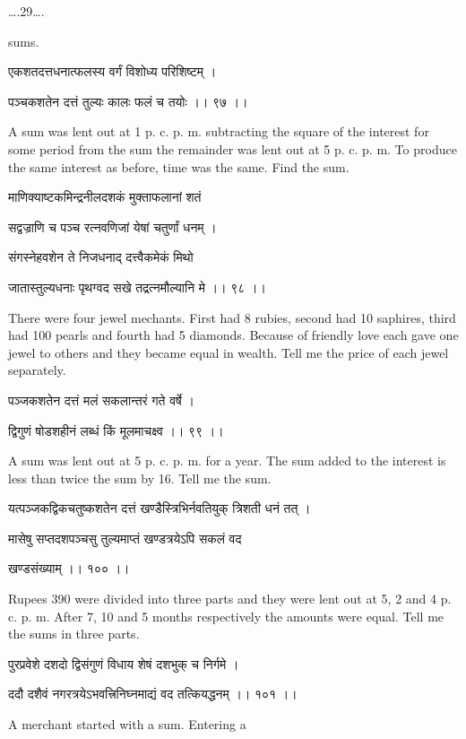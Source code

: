 \documentclass[]{article}
\date{}
\begin{document}
{\ldots{}.29\ldots{}.}

{sums.}

{एकशतदत्तधनात्फलस्य वर्गं विशोध्य परिशिष्टम् । }

{पञ्चकशतेन दत्तं तुल्यः कालः फलं च तयोः ।। ९७ ।। }

{A sum was lent out at 1 p. c. p. m. subtracting the square of the
interest for some period from the sum the remainder was lent out at 5 p.
c. p. m. To produce the same interest as before, time was the same. Find
the sum.}

{माणिक्याष्टकमिन्द्रनीलदशकं मुक्ताफलानां शतं }

{सद्वज्राणि च पञ्च रत्नवणिजां येषां चतुर्णां धनम् । }

{संगस्नेहवशेन ते निजधनाद् दत्त्वैकमेकं मिथो }

{जातास्तुल्यधनाः पृथग्वद सखे तद्रत्नमौल्यानि मे ।। ९८ ।। }

{There were four jewel mechants. First had 8 rubies, second had 10
saphires, third had 100 pearls and fourth had 5 diamonds. Because of
friendly love each gave one jewel to others and they became equal in
wealth. Tell me the price of each jewel separately.}

{पञ्जकशतेन दत्तं मलं सकलान्तरं गते वर्षे । }

{द्विगुणं षोडशहीनं लब्धं किं मूलमाचक्ष्व ।। ९९ ।। }

{A sum was lent out at 5 p. c. p. m. for a year. The sum added to the
interest is less than twice the sum by 16. Tell me the sum.}

{यत्पञ्जकद्विकचतुष्कशतेन दत्तं खण्डैस्त्रिभिर्नवतियुक् त्रिशती धनं तत् ।
}

{मासेषु सप्तदशपञ्चसु तुल्यमाप्तं खण्डत्रयेऽपि सकलं वद }

{खण्डसंख्याम् ।। १०० ।। }

{Rupees 390 were divided into three parts and they were lent out at 5, 2
and 4 p. c. p. m. After 7, 10 and 5 months respectively the amounts were
equal. Tell me the sums in three parts.}

{पुरप्रवेशे दशदो द्विसंगुणं विधाय शेषं दशभुक् च निर्गमे । }

{ददौ दशैवं नगरत्रयेऽभवत्त्रिनिघ्नमाद्यं वद तत्कियद्धनम् ।। १०१ ।। }

{A merchant started with a sum. Entering a }
\end{document}
